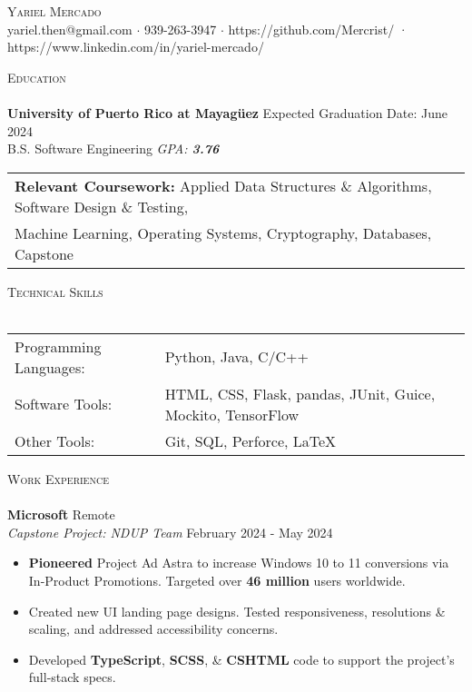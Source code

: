 \documentclass[a4paper]{article}
\newcommand{\lineunder} {
    \vspace*{-8pt} \\
    \hspace*{-18pt} \hrulefill \\
}
\newcommand{\header} [1] {
    {\hspace*{-18pt}\vspace*{6pt} \textsc{#1}}
    \vspace*{-6pt} \lineunder
}
\begin{document}
\vspace*{-40pt}

    

\vspace*{-10pt}
\begin{center}
	{\Huge \scshape {Yariel Mercado}}\\
	yariel.then@gmail.com $\cdot$ 939-263-3947 $\cdot$ https://github.com/Mercrist/ · https://www.linkedin.com/in/yariel-mercado/\\
\end{center}

\header{Education}
\textbf{University of Puerto Rico at Mayagüez} \hfill Expected Graduation Date: June 2024\\	
B.S. Software Engineering \textit{GPA: \bf{3.76}} 

\vspace{2mm}
\begin{tabular}{ l l }
	\textbf{Relevant Coursework:} Applied Data Structures \& Algorithms, Software Design \& Testing, \\Machine Learning, Operating Systems, Cryptography, Databases, Capstone 
\vspace{2mm}
\end{tabular}

\header{Technical Skills}
\begin{tabular}{ l l }
	Programming Languages: & Python, Java, C/C++    \\
	Software Tools: & HTML, CSS, Flask, pandas, JUnit, Guice, Mockito, TensorFlow \\
	Other Tools:   & Git, SQL, Perforce, \LaTeX{} \\
	
\end{tabular}
\vspace{2mm}

\header{Work Experience}
\vspace{-1mm}
\textbf{Microsoft} \hfill Remote\\
\textit{Capstone Project: NDUP Team} \hfill February 2024 - May 2024\\
\vspace{-3mm}
\begin{itemize} \itemsep -1pt
	\item \textbf{Pioneered} Project Ad Astra to increase Windows 10 to 11 conversions via In-Product Promotions. Targeted over \textbf{46 million} users worldwide. 
	\item Created new UI landing page designs. Tested responsiveness, resolutions \& scaling, and addressed accessibility concerns. 
	\item Developed \textbf{TypeScript}, \textbf{SCSS}, \& \textbf{CSHTML} code to support the project's full-stack specs.
\end{itemize} 
\vspace{-2mm}
\end{document}
